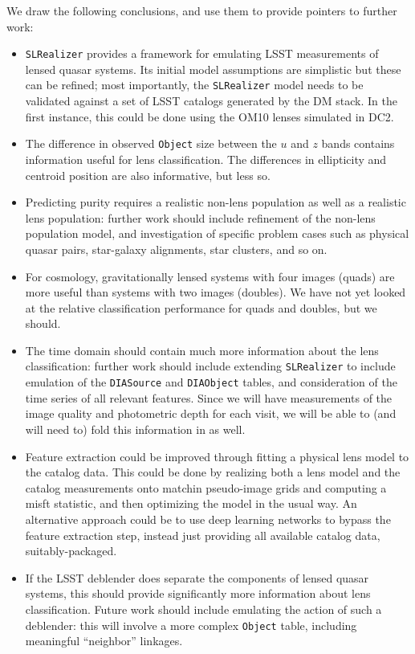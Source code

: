 \documentclass[\docopts]{\docclass}
\def\SLRealizer{\texttt{SLRealizer}\xspace}
\def\Object{\texttt{Object}\xspace}
\def\DIAObject{\texttt{DIAObject}\xspace}
\def\DIASource{\texttt{DIASource}\xspace}
\begin{document}
We draw the following conclusions, and use them to provide pointers to further work:
\begin{itemize}

    \item \SLRealizer provides a framework for emulating LSST
    measurements of lensed quasar systems. Its initial model assumptions
    are simplistic but these can be refined; most importantly, the
    \SLRealizer model needs to be validated against a set of LSST
    catalogs generated by the DM stack. In the first instance, this
    could be done using the OM10 lenses simulated in DC2.

    \item The difference in observed \Object size between the $u$ and
    $z$ bands contains information useful for lens classification. The
    differences in ellipticity and centroid position are also
    informative, but less so.

    \item Predicting purity requires a realistic non-lens population as
    well as a realistic lens population: further work should include
    refinement of the non-lens population model, and investigation of
    specific problem cases such as physical quasar pairs, star-galaxy
    alignments, star clusters, and so on.

    \item For cosmology, gravitationally lensed systems
    with four images (quads) are more useful than systems with
    two images (doubles). We have not yet looked at the relative classification performance for quads and doubles, but we should.

    \item The time domain should contain much more information about the
    lens classification: further work should include extending
    \SLRealizer to include emulation of the \DIASource and \DIAObject
    tables, and consideration of the time series of all relevant
    features. Since we will have measurements of the image quality and photometric depth for each visit, we will be able to (and will need to) fold this information in as well.

    \item Feature extraction could be improved through fitting a
    physical lens model to the catalog data. This could be done by
    realizing both a lens model and the catalog measurements onto
    matchin pseudo-image grids and computing a misft statistic, and then
    optimizing the model in the usual way. An alternative approach could
    be to use deep learning networks to bypass the feature extraction
    step, instead just providing all available catalog data,
    suitably-packaged.

    \item If the LSST deblender does separate the components of lensed quasar systems, this should provide significantly more information
    about lens classification. Future work should include emulating the action of such a deblender: this will involve a more complex \Object table, including meaningful ``neighbor'' linkages.

\end{itemize}
\end{document}
